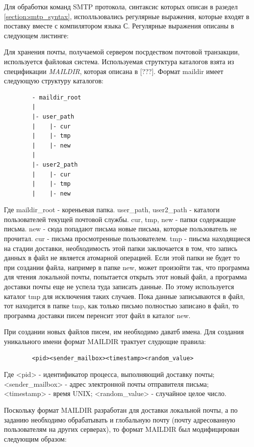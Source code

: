 \documentclass[a4paper,12pt]{report}
\begin{document}
    Для обработки команд SMTP протокола, синтаксис которых описан в разедел \ref{section:smtp_syntax}, исполльзовались регулярные выражения, которые входят в поставку вместе с компилятором языка С. Регулярные выражения описаны в следующем листинге:
    
    
    Для хранения почты, получаемой сервером посрдеством почтовой транзакции, используется файловая система. Используемая струтктура каталогов взята из спецификации \textit{MAILDIR}, которая описана в [???]. Формат maildir имеет следующую структуру каталогов:
    \begin{verbatim}
        - maildir_root
        |
        |- user_path
        |    |- cur
        |    |- tmp
        |    |- new
        |
        |- user2_path
        |    |- cur
        |    |- tmp
        |    |- new
    \end{verbatim}
    Где maildir\_root - кореньевая папка. user\_path, user2\_path - каталоги пользователей текущей почтовой службы. cur, tmp, new - папки содержащие письма. 
    new - сюда попадают письма новые письма, которые пользователь не прочитал. cur - письма просмотренные пользователем. tmp - пиьсма находящиеся на стадии доставки, необходимость этой папки заключается в том, что запись данных в файл не является атомарной операцией. Если этой папки не будет то при создании файла, например в папке new, может произойти так, что программа для чтения локальной почты, попытается открыть этот новый файл, а программа доставки почты еще не успела туда записать данные. По этому используется каталог tmp для исключения таких случаев. Пока данные записываются в файл, тот находится в папке tmp, как только письмо полностью записано в файл, то программа доставки писем перенсит этот файл в каталог new.
    
    При создании новых файлов писем, им необходимо даватб имена. Для создания уникального имени формат MAILDIR трактует слудющие правила:
    \begin{verbatim}
        <pid><sender_mailbox><timestamp><random_value>
    \end{verbatim}
    Где <pid> - идентификатор процесса, выполняющий доставку почты; <sender\_mailbox> - адрес электронной почты отправителя письма;  <timestamp> - время UNIX; <random\_value> - случайное целое число.
    
    Поскольку формат MAILDIR разработан для доставки локальной почты, а по заданию необходимо обрабатывать и глобальную почту (почту адресованную пользователям на других серверах), то формат MAILDIR был модифицирован следующим образом: 
        
\end{document}
